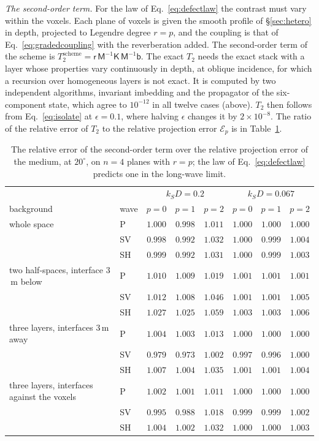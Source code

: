 \documentclass[11pt,a4paper]{article}
\begin{document}
\emph{The second-order term.} For the law of Eq.~\eqref{eq:defectlaw} the contrast must vary within
the voxels. Each plane of voxels is given the smooth profile of \S\ref{sec:hetero} in depth, projected
to Legendre degree $r=p$, and the coupling is that of Eq.~\eqref{eq:gradedcoupling} with the
reverberation added. The second-order term of the scheme is
$T_2^{\text{scheme}}=\mathsf{r}\,\mathsf{M}^{-1}\mathsf{K}\,\mathsf{M}^{-1}\mathsf{b}$. The exact $T_2$
needs the exact stack with a layer whose properties vary continuously in depth, at oblique incidence,
for which a recursion over homogeneous layers is not exact. It is computed by two independent algorithms, invariant imbedding \citep{Haines2004} and the
propagator of the six-component state, which agree to $10^{-12}$ in all twelve cases
(above). $T_2$ then follows
from Eq.~\eqref{eq:isolate} at $\epsilon=0.1$, where halving $\epsilon$ changes it by $2\times10^{-8}$. The ratio of the relative error of $T_2$ to the
relative projection error $\mathcal{E}_p$ is in Table~\ref{tab:obliquelaw}.
\begin{table}[htbp]
\centering
\caption{The relative error of the second-order term over the relative projection error of the medium,
at $20^\circ$, on $n=4$ planes with $r=p$; the law of Eq.~\eqref{eq:defectlaw} predicts one in the
long-wave limit.}\label{tab:obliquelaw}
\small\setlength{\tabcolsep}{4pt}
\begin{tabular}{@{}llcccccc@{}}
\toprule
 & & \multicolumn{3}{c}{$k_SD=0.2$} & \multicolumn{3}{c}{$k_SD=0.067$} \\
background & wave & $p=0$ & $p=1$ & $p=2$ & $p=0$ & $p=1$ & $p=2$ \\
\midrule
whole space & P & $1.000$ & $0.998$ & $1.011$ & $1.000$ & $1.000$ & $1.000$ \\
 & SV & $0.998$ & $0.992$ & $1.032$ & $1.000$ & $0.999$ & $1.004$ \\
 & SH & $0.999$ & $0.992$ & $1.031$ & $1.000$ & $0.999$ & $1.003$ \\
two half-spaces, interface $3$\,m below & P & $1.010$ & $1.009$ & $1.019$ & $1.001$ & $1.001$ & $1.001$ \\
 & SV & $1.012$ & $1.008$ & $1.046$ & $1.001$ & $1.001$ & $1.005$ \\
 & SH & $1.027$ & $1.025$ & $1.059$ & $1.003$ & $1.003$ & $1.006$ \\
three layers, interfaces $3$\,m away & P & $1.004$ & $1.003$ & $1.013$ & $1.000$ & $1.000$ & $1.000$ \\
 & SV & $0.979$ & $0.973$ & $1.002$ & $0.997$ & $0.996$ & $1.000$ \\
 & SH & $1.007$ & $1.004$ & $1.035$ & $1.001$ & $1.001$ & $1.004$ \\
three layers, interfaces against the voxels & P & $1.002$ & $1.001$ & $1.011$ & $1.000$ & $1.000$ & $1.000$ \\
 & SV & $0.995$ & $0.988$ & $1.018$ & $0.999$ & $0.999$ & $1.002$ \\
 & SH & $1.004$ & $1.002$ & $1.032$ & $1.000$ & $1.000$ & $1.003$ \\
\bottomrule
\end{tabular}
\end{table}
\end{document}
